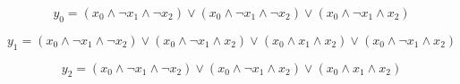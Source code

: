 \documentclass{scrartcl}
\begin{document}
	
$$y_0 = (x_0 \wedge  \lnot x_1 \wedge  \lnot x_2) \lor (x_0 \wedge  \lnot x_1 \wedge  \lnot x_2) \lor (x_0 \wedge  \lnot x_1 \wedge x_2)$$

$$y_1 = (x_0 \wedge  \lnot x_1 \wedge  \lnot x_2) \lor (x_0 \wedge  \lnot x_1 \wedge x_2) \lor (x_0 \wedge x_1 \wedge x_2) \lor (x_0 \wedge  \lnot x_1 \wedge x_2)$$

$$y_2 = (x_0 \wedge  \lnot x_1 \wedge  \lnot x_2) \lor (x_0 \wedge  \lnot x_1 \wedge x_2) \lor (x_0 \wedge x_1 \wedge x_2)$$
\end{document}
